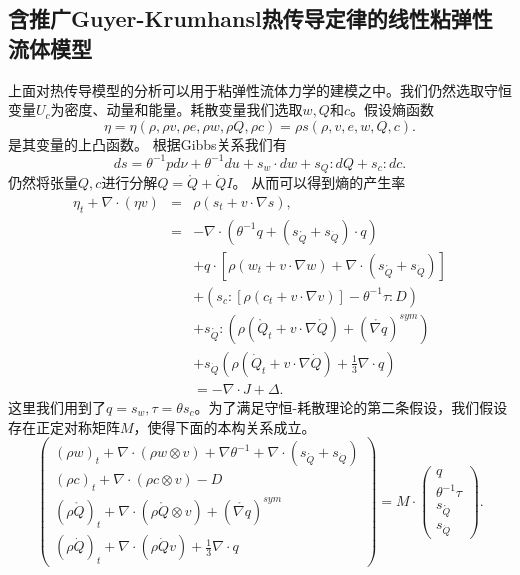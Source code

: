 \subsection{含推广Guyer-Krumhansl热传导定律的线性粘弹性流体模型}
上面对热传导模型的分析可以用于粘弹性流体力学的建模之中。我们仍然选取守恒变量$U_c$为密度、动量和能量。耗散变量我们选取$w,Q$和$c$。假设熵函数
\begin{equation*}
	\eta = \eta (\rho,\rho v,\rho e,\rho w,\rho Q,\rho c) = \rho s(\rho,v,e,w,Q,c).
\end{equation*}
是其变量的上凸函数。
根据Gibbs关系我们有
\begin{equation*}
			ds = \theta^{-1} pd\nu + \theta^{-1} du + s_w \cdot dw + s_Q : d Q+ s_c : dc.
\end{equation*}
仍然将张量$Q,c$进行分解$Q = \mathring{Q} +\dot{Q}I$。
从而可以得到熵的产生率
\begin{eqnarray*}
		\eta_t + \nabla \cdot (\eta v) &=& \rho (s_t + v \cdot \nabla s), \\
		&=& -\nabla \cdot (\theta^{-1} q + (s_{\mathring{{Q}}}+s_{\dot{Q}}) \cdot {q} )  \\
		&&+ q \cdot [\rho (w_t + v \cdot \nabla w) + \nabla \cdot (s_{\mathring{{Q}}}+s_{\dot{Q}})] \\
		&&+ (s_c:[\rho (c_t + v \cdot \nabla v)] - \theta^{-1} \tau : D) \\
		&&+s_{\mathring{{Q}}}:(\rho (\mathring{{Q}}_t + v \cdot \nabla \mathring{Q})+(\mathring{\nabla {q}})^{sym}) \\
		&&+s_{\dot{Q}}(\rho (\dot{Q}_t + v \cdot \nabla \dot{Q})+\frac{1}{3}\nabla \cdot {q}) \\
		&& = -\nabla \cdot J + \Delta. 
\end{eqnarray*}
这里我们用到了$q=s_w,\tau = \theta s_c$。为了满足守恒-耗散理论的第二条假设，我们假设存在正定对称矩阵$M$，使得下面的本构关系成立。
\begin{equation*}
   	\left( \begin{array}{c} 
			(\rho w)_t +  \nabla \cdot (\rho w \otimes v)  + \nabla \theta^{-1} + \nabla \cdot (s_{\mathring{{Q}}}+s_{\dot{Q}})\\
			(\rho c)_t +  \nabla \cdot (\rho c \otimes v)  - D \\
			(\rho \mathring{{Q}})_t + \nabla \cdot (\rho \mathring{Q} \otimes v)+(\mathring{\nabla {q}})^{sym} \\ (\rho \dot{Q})_t + \nabla \cdot (\rho \dot{Q} v)+\frac{1}{3} \nabla \cdot {q}
		\end{array} \right) = M \cdot
		\left( \begin{array}{c} 
			q \\ \theta^{-1} \tau \\s_{\mathring{{Q}}} \\s_{\dot{Q}}
		\end{array}\right).
\end{equation*} 
